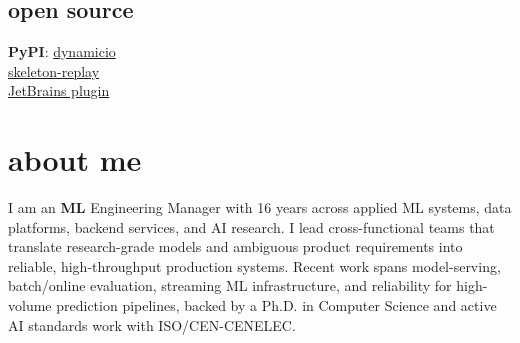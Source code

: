 \documentclass[]{../../friggeri-cv}
\begin{document}
\begin{aside}
    \section{open source}
        {\footnotesize \textbf{PyPI}: \href{https://pypi.org/project/dynamicio/}{dynamicio}\\\href{https://pypi.org/project/skeleton-replay/}{skeleton-replay}\\\href{https://plugins.jetbrains.com/plugin/32807-skeleton-replay}{JetBrains plugin}}
\end{aside}

\section{about me}
{\normalsize I am an \textbf{ML} Engineering Manager with 16 years across applied ML systems, data platforms, backend services, and AI research. I lead cross-functional teams that translate research-grade models and ambiguous product requirements into reliable, high-throughput production systems. Recent work spans model-serving, batch/online evaluation, streaming ML infrastructure, and reliability for high-volume prediction pipelines, backed by a Ph.D. in Computer Science and active AI standards work with ISO/CEN-CENELEC.}
\end{document}
